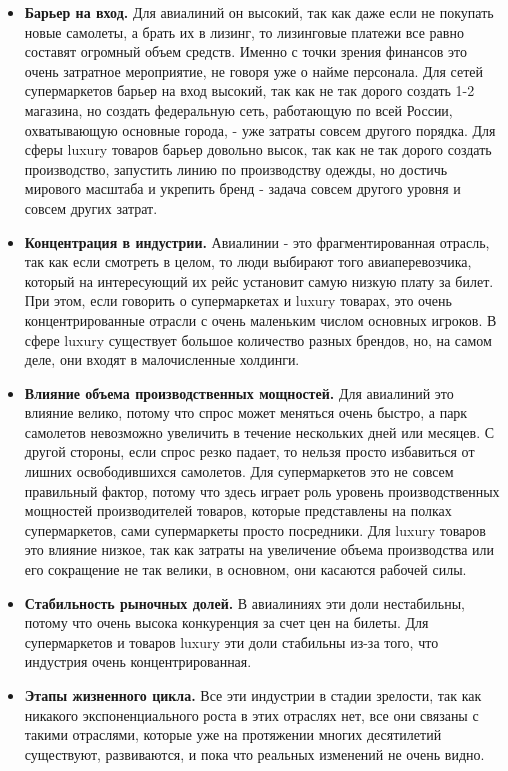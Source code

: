 \documentclass{article}
\begin{document}
	\begin{itemize}
		\item \textbf{Барьер на вход.} Для авиалиний он высокий, так как даже если не покупать новые самолеты, а брать их в лизинг, то лизинговые платежи все равно составят огромный объем средств. Именно с точки зрения финансов это очень затратное мероприятие, не говоря уже о найме персонала. Для сетей супермаркетов барьер на вход высокий, так как не так дорого создать 1-2 магазина, но создать федеральную сеть, работающую по всей России, охватывающую основные города, - уже затраты совсем другого порядка. Для сферы luxury товаров барьер довольно высок, так как не так дорого создать производство, запустить линию по производству одежды, но достичь мирового масштаба и укрепить бренд - задача совсем другого уровня и совсем других затрат.
	
	\item \textbf{Концентрация в индустрии.} Авиалинии - это фрагментированная отрасль, так как если смотреть в целом, то люди выбирают того авиаперевозчика, который на интересующий их рейс установит самую низкую плату за билет. При этом, если говорить о супермаркетах и luxury товарах, это очень концентрированные отрасли с очень маленьким числом основных игроков. В сфере luxury существует большое количество разных брендов, но, на самом деле, они входят в малочисленные холдинги.
	
	\item \textbf{Влияние объема производственных мощностей.} Для авиалиний это влияние велико, потому что спрос может меняться очень быстро, а парк самолетов невозможно увеличить в течение нескольких дней или месяцев. С другой стороны, если спрос резко падает, то нельзя просто избавиться от лишних освободившихся самолетов. Для супермаркетов это не совсем правильный фактор, потому что здесь играет роль уровень производственных мощностей производителей товаров, которые представлены на полках супермаркетов, сами супермаркеты просто посредники. Для luxury товаров это влияние низкое, так как затраты на увеличение объема производства или его сокращение не так велики, в основном, они касаются рабочей силы.
	
	\item \textbf {Стабильность рыночных долей.} В авиалиниях эти доли нестабильны, потому что очень высока конкуренция за счет цен на билеты. Для супермаркетов и товаров luxury эти доли стабильны из-за того, что индустрия очень концентрированная.
	
	\item \textbf{Этапы жизненного цикла.} Все эти индустрии в стадии зрелости, так как никакого экспоненциального роста в этих отраслях нет, все они связаны с такими отраслями, которые уже на протяжении многих десятилетий существуют, развиваются, и пока что реальных изменений не очень видно.
	

\end{itemize}
\end{document}
